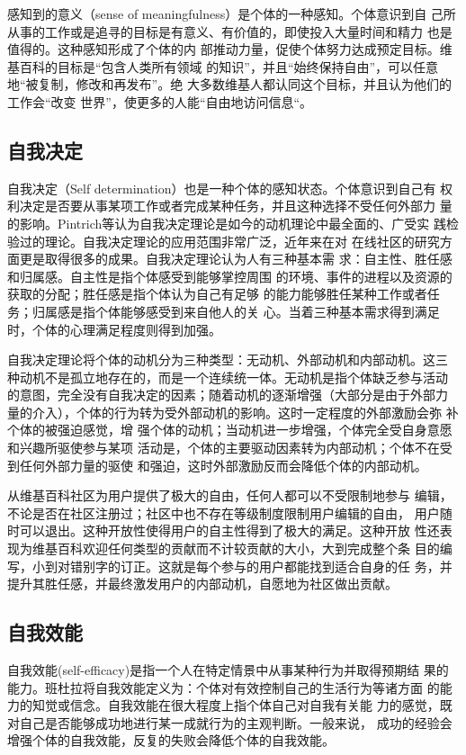 感知到的意义（sense of meaningfulness）是个体的一种感知。个体意识到自
己所从事的工作或是追寻的目标是有意义、有价值的，即使投入大量时间和精力
也是值得的。这种感知形成了个体的内
部推动力量，促使个体努力达成预定目标。维基百科的目标是“包含人类所有领域
的知识”，并且“始终保持自由”，可以任意地“被复制，修改和再发布”。绝
大多数维基人都认同这个目标，并且认为他们的工作会“改变
世界”，使更多的人能“自由地访问信息“。

\subsection{自我决定}
\label{sec:self-determination}

自我决定（Self determination）也是一种个体的感知状态。个体意识到自己有
权利决定是否要从事某项工作或者完成某种任务，并且这种选择不受任何外部力
量的影响。Pintrich等认为自我决定理论是如今的动机理论中最全面的、广受实
践检验过的理论。自我决定理论的应用范围非常广泛，近年来在对
在线社区的研究方面更是取得很多的成果。自我决定理论认为人有三种基本需
求：自主性、胜任感和归属感。自主性是指个体感受到能够掌控周围
的环境、事件的进程以及资源的获取的分配；胜任感是指个体认为自己有足够
的能力能够胜任某种工作或者任务；归属感是指个体能够感受到来自他人的关
心。当着三种基本需求得到满足时，个体的心理满足程度则得到加强。

自我决定理论将个体的动机分为三种类型：无动机、外部动机和内部动机。这三
种动机不是孤立地存在的，而是一个连续统一体。无动机是指个体缺乏参与活动
的意图，完全没有自我决定的因素；随着动机的逐渐增强（大部分是由于外部力
量的介入），个体的行为转为受外部动机的影响。这时一定程度的外部激励会弥
补个体的被强迫感觉，增
强个体的动机；当动机进一步增强，个体完全受自身意愿和兴趣所驱使参与某项
活动是，个体的主要驱动因素转为内部动机；个体不在受到任何外部力量的驱使
和强迫，这时外部激励反而会降低个体的内部动机。

从维基百科社区为用户提供了极大的自由，任何人都可以不受限制地参与
编辑，不论是否在社区注册过；社区中也不存在等级制度限制用户编辑的自由，
用户随时可以退出。这种开放性使得用户的自主性得到了极大的满足。这种开放
性还表现为维基百科欢迎任何类型的贡献而不计较贡献的大小，大到完成整个条
目的编写，小到对错别字的订正。这就是每个参与的用户都能找到适合自身的任
务，并提升其胜任感，并最终激发用户的内部动机，自愿地为社区做出贡献。

\subsection{自我效能}
\label{sec:self-efficacy}

自我效能(self-efficacy)是指一个人在特定情景中从事某种行为并取得预期结
果的能力。班杜拉将自我效能定义为：个体对有效控制自己的生活行为等诸方面
的能力的知觉或信念\cite{}。自我效能在很大程度上指个体自己对自我有关能
力的感觉，既对自己是否能够成功地进行某一成就行为的主观判断。一般来说，
成功的经验会增强个体的自我效能，反复的失败会降低个体的自我效能。

